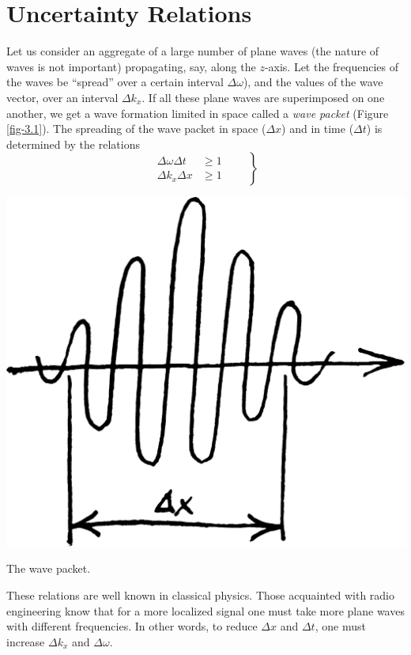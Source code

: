 \documentclass[a4paper,sfsidenotes,colorlinks=true]{tufte-book}
\numberwithin{equation}{section}
\numberwithin{figure}{section}
\begin{document}
\section{Uncertainty Relations}
\label{sec-03}
Let us consider
an aggregate of a large number of plane waves (the nature of waves is
not important) propagating, say, along the $z$-axis. Let the frequencies
of the waves be ``spread'' over a certain interval $\Delta \omega$), and the values
of the wave vector, over an interval $\Delta k_{x}$. If all these plane waves are
superimposed on one another, we get a wave formation limited in space
called a \emph{wave packet} (Figure \ref{fig-3.1}). The spreading of the wave packet in
space ($\Delta x$) and in time ($\Delta t$) is determined by the
relations 
\begin{equation}%
\left.
\begin{split}
\Delta \omega \Delta t & \geqslant 1  \\
\Delta k_{x} \Delta x  & \geqslant 1
\end{split}
\quad \quad \right\}
\label{eq-3.1}
\end{equation}
\begin{marginfigure}[1cm]
\centering
\includegraphics[width=\linewidth]{figures/fig-03-01.pdf}
\caption{The wave packet.}
\label{fig-3.1}
\end{marginfigure}
These relations are well known in classical physics. Those acquainted
with radio engineering know that for a more localized signal one must
take more plane waves with different frequencies. In other words, to
reduce $\Delta x$ and $\Delta t$, one must increase $\Delta k_{x}$ and
$\Delta \omega$.  
\end{document}

